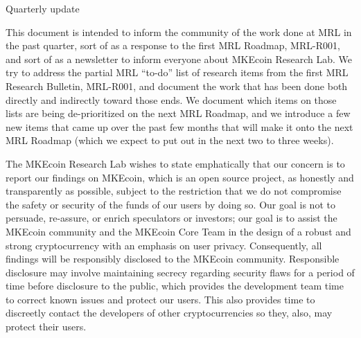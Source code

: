 \documentclass[12pt,english]{mrl}
\theoremstyle{definition}
\numberwithin{equation}{section}
\numberwithin{figure}{section}
\numberwithin{equation}{section}
\numberwithin{equation}{section}
\numberwithin{figure}{section}
\begin{document}
\begin{frontmatter}

\begin{fmbox}
{\huge\sffamily Quarterly update} \hfill\setlength{\fboxrule}{0px}\setlength{\fboxsep}{5px}
\dochead{}
\date{\today}
\author[
   addressref={mrl},
   email={bggoode@g.clemson.edu}
]{ }


\address[id=mrl]{
}
\end{fmbox}

\end{frontmatter}

This document is intended to inform the community of the work done at MRL in the past quarter, sort of as a response to the first MRL Roadmap, MRL-R001, and sort of as a newsletter to inform everyone about MKEcoin Research Lab. We try to address the partial MRL ``to-do'' list of research items from the first MRL Research Bulletin, MRL-R001, and document the work that has been done both directly and indirectly toward those ends. We document which items on those lists are being de-prioritized on the next MRL Roadmap, and we introduce a few new items that came up over the past few months that will make it onto the next MRL Roadmap (which we expect to put out in the next two to three weeks).

The MKEcoin Research Lab wishes to state emphatically that our concern is to report our findings on MKEcoin, which is an open source project, as honestly and transparently as possible, subject to the restriction that we do not compromise the safety or security of the funds of our users by doing so. Our goal is not to persuade, re-assure, or enrich speculators or investors; our goal is to assist the MKEcoin community and the MKEcoin Core Team in the design of a robust and strong cryptocurrency with an emphasis on user privacy.  Consequently, all findings will be responsibly disclosed to the MKEcoin community. Responsible disclosure may involve maintaining secrecy regarding security flaws for a period of time before disclosure to the public, which provides the development team time to correct known issues and protect our users. This also provides time to discreetly contact the developers of other cryptocurrencies so they, also, may protect their users.
\end{document}
